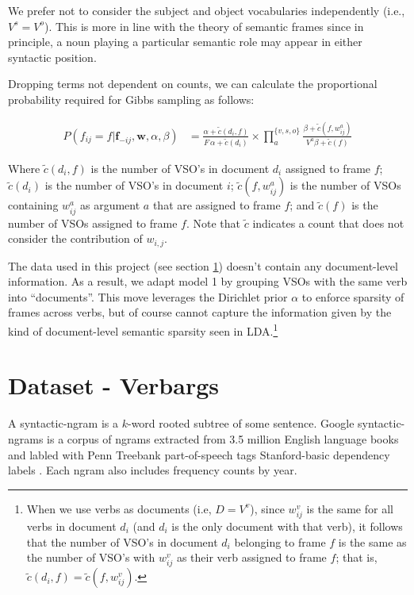 \documentclass{article} %
\begin{document}
We prefer not to consider the subject and object vocabularies independently 
(i.e., $V^s = V^o$). This is more in line with the theory of semantic frames 
since in principle, a noun playing a particular semantic role may appear in either 
syntactic position.

Dropping terms not dependent on counts, we can calculate the proportional
probability required for Gibbs sampling as follows:

\begin{align}
P(f_{ij} = f|\mathbf{f}_{-ij},\mathbf{w}, \alpha,\beta)
&=\frac{\alpha + \tilde c(d_i,f)}{F\,\alpha + \tilde c(d_i)}
\times \prod_a^{\{v,s,o\}}\frac{\beta+\tilde c(f,w_{ij}^a)}{V^a\beta+\tilde c(f)}
\end{align}

Where $\tilde c (d_i, f)$ is the number of VSO's in document $d_i$ assigned to frame $f$;
$\tilde c(d_i)$ is the number of VSO's in document $i$;
$\tilde c(f,w_{ij}^a)$ is the number of VSOs containing $w_{ij}^a$ as argument $a$ that are
assigned to frame $f$; and
$\tilde c(f)$ is the number of VSOs assigned to frame $f$.
Note that $\tilde c$ indicates a count that does not consider the contribution of 
$w_{i,j}$.

The data used in this project (see section \ref{data}) doesn't contain any document-level
information. As a result, we adapt model 1 by grouping VSOs with the same verb into ``documents''.
This move leverages the Dirichlet prior $\alpha$ to enforce sparsity of frames 
across verbs, but of course cannot capture the information given by the kind of
document-level semantic sparsity seen in LDA.\footnote{When we use verbs as
documents (i.e, $D = V^v$), since $w_{ij}^v$ is the same for all verbs in document $d_i$ 
(and $d_i$ is the only document with that verb), it follows that the number of VSO's in document 
$d_i$ belonging to frame $f$ is the same as the number of VSO's with $w_{ij}^v$ as their verb assigned to 
frame $f$; that is, $\tilde c(d_i, f) = \tilde c(f, w_{ij}^v)$.}

\section{Dataset - Verbargs}
\label{data}

A syntactic-ngram is a $k$-word rooted subtree of some sentence.
Google syntactic-ngrams is a corpus of ngrams extracted from 3.5 million English language 
books and labled with Penn Treebank part-of-speech tags Stanford-basic dependency 
labels \citep{ngrams2013}.
Each ngram also includes frequency counts by year.
\end{document}
